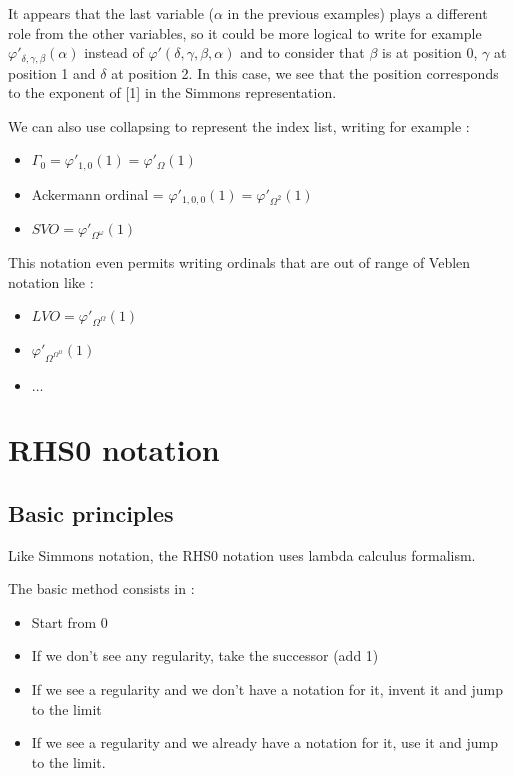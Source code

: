 \documentclass[10pt]{article}
\begin{document}
It appears that the last variable (\(\alpha\) in the previous examples) plays a different role from the other variables, so it could be more logical to write for example  \( \varphi'_{\delta,\gamma,\beta}(\alpha) \) instead of \( \varphi'(\delta,\gamma,\beta,\alpha) \) and to consider that \( \beta \) is at position 0, \( \gamma \) at position 1 and \( \delta \) at position 2. In this case, we see that the position corresponds to the exponent of [1] in the Simmons representation.

We can also use collapsing to represent the index list, writing for example :

\begin{itemize}
     \setlength{\itemsep}{1pt}
     \setlength{\parskip}{0pt}
     \setlength{\parsep}{0pt}
\item \( \Gamma_0 = \varphi'_{1,0}(1) = \varphi'_\Omega(1) \)
\item Ackermann ordinal = \( \varphi'_{1,0,0}(1) = \varphi'_{\Omega^2}(1) \)
\item \( SVO = \varphi'_{\Omega^\omega}(1) \)
\end{itemize}

This notation even permits writing ordinals that are out of range of Veblen notation like :

\begin{itemize}
     \setlength{\itemsep}{1pt}
     \setlength{\parskip}{0pt}
     \setlength{\parsep}{0pt}
\item \( LVO = \varphi'_{\Omega^\Omega}(1) \)
\item \( \varphi'_{\Omega^{\Omega^\Omega}}(1) \)
\item \( \ldots \)
\end{itemize}

\section{RHS0 notation}

\subsection{Basic principles}

Like Simmons notation, the RHS0 notation uses lambda calculus formalism.

The basic method consists in :

\begin{itemize}
     \setlength{\itemsep}{1pt}
     \setlength{\parskip}{0pt}
     \setlength{\parsep}{0pt}
\item    Start from 0
\item    If we don't see any regularity, take the successor (add 1)
\item    If we see a regularity and we don't have a notation for it, invent it and jump to the limit
\item    If we see a regularity and we already have a notation for it, use it and jump to the limit. 
\end{itemize}
\end{document}
